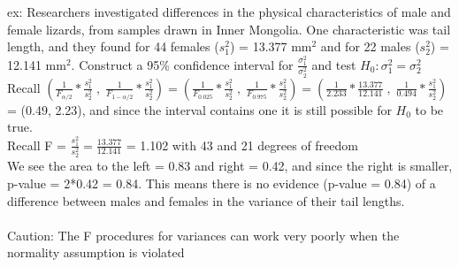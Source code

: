 \documentclass[12pt, a4paper]{article}
\begin{document}
	\noindent ex: Researchers investigated differences in the physical characteristics of male and female lizards, from samples drawn in Inner Mongolia. One characteristic was tail length, and they found for 44 females ($s_1^2$) = 13.377 mm$^2$ and for 22 males ($s_2^2$) = 12.141 mm$^2$. Construct a 95\% confidence interval for $\frac{\sigma^2_1}{\sigma^2_2}$ and test $H_0: \sigma_1^2 = \sigma_2^2$ \\
	Recall $(\frac{1}{F_{\alpha/2}}*\frac{s^2_1}{s^2_2}\;,\;\frac{1}{F_{1-\alpha/2}}*\frac{s^2_1}{s^2_2}) = (\frac{1}{F_{0.025}}*\frac{s^2_1}{s^2_2}\;,\;\frac{1}{F_{0.975}}*\frac{s^2_1}{s^2_2}) = (\frac{1}{2.233}*\frac{13.377}{12.141}\;,\;\frac{1}{0.494}*\frac{s^2_1}{s^2_2})$ \\ = (0.49, 2.23), and since the interval contains one it is still possible for $H_0$ to be true. \\
	Recall F = $\frac{s^2_1}{s^2_2} = \frac{13.377}{12.141}$ = 1.102 with 43 and 21 degrees of freedom \\
	We see the area to the left = 0.83 and right = 0.42, and since the right is smaller, p-value = 2*0.42 = 0.84. This means there is no evidence (p-value = 0.84) of a difference between males and females in the variance of their tail lengths. \\~\\
	Caution: The F procedures for variances can work very poorly when the normality assumption is violated \\~\\
	
\end{document}
